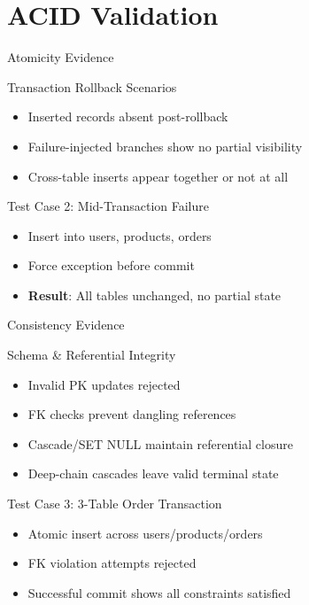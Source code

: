 \documentclass[aspectratio=169]{beamer}
\begin{document}
\section{ACID Validation}

\begin{frame}{Atomicity Evidence}
\begin{block}{Transaction Rollback Scenarios}
\begin{itemize}
  \item Inserted records absent post-rollback
  \item Failure-injected branches show no partial visibility
  \item Cross-table inserts appear together or not at all
\end{itemize}
\end{block}

\begin{exampleblock}{Test Case 2: Mid-Transaction Failure}
\begin{itemize}
  \item Insert into users, products, orders
  \item Force exception before commit
  \item \textbf{Result}: All tables unchanged, no partial state
\end{itemize}
\end{exampleblock}
\end{frame}

\begin{frame}{Consistency Evidence}
\begin{block}{Schema \& Referential Integrity}
\begin{itemize}
  \item Invalid PK updates rejected
  \item FK checks prevent dangling references
  \item Cascade/SET NULL maintain referential closure
  \item Deep-chain cascades leave valid terminal state
\end{itemize}
\end{block}

\begin{exampleblock}{Test Case 3: 3-Table Order Transaction}
\begin{itemize}
  \item Atomic insert across users/products/orders
  \item FK violation attempts rejected
  \item Successful commit shows all constraints satisfied
\end{itemize}
\end{exampleblock}
\end{frame}
\end{document}
